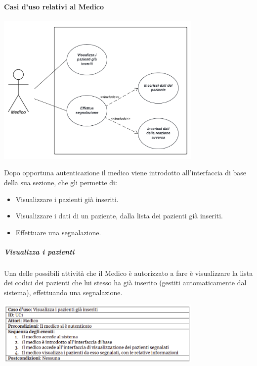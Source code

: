 \documentclass{article}
\begin{document}
\paragraph*{Casi d'uso relativi al Medico}
\begin{center}
    \includegraphics[width=0.75\textwidth]{pictures/CasoDUsoMedico.png}
\end{center}
Dopo opportuna autenticazione il medico viene introdotto all'interfaccia di base della sua sezione, che gli permette di:
\begin{itemize}
    \item Visualizzare i pazienti già inseriti.
    \item Visualizzare i dati di un paziente, dalla lista dei pazienti già inseriti.
    \item Effettuare una segnalazione.
\end{itemize}
\subparagraph*{Visualizza i pazienti}
Una delle possibili attività che il Medico è autorizzato a fare è visualizzare la lista dei codici dei pazienti che lui stesso ha già inserito (gestiti automaticamente dal sistema), effettuando una segnalazione.
\begin{center}
    \includegraphics[width=0.75\textwidth]{pictures/UC1.png}
\end{center}
\end{document}
